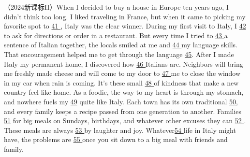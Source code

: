 \documentclass[a4paper]{ctexart}
\begin{document}
（2024新课标II）When I decided to buy a house in Europe ten years ago, I didn't think too long. I liked traveling in France, but when it came to picking my favorite spot to  \underline{\hspace{0.5cm}41 \hspace{0.5cm}}, Italy was the clear winner. During my first visit to Italy, I \underline{\hspace{0.5cm}42 \hspace{0.5cm}} to ask for directions or order in a restaurant. But every time I tried to \underline{\hspace{0.5cm}43 \hspace{0.5cm}} a sentence of Italian together, the locals smiled at me and \underline{\hspace{0.5cm}44 \hspace{0.5cm}} my language skills. That encouragement helped me to get through the language \underline{\hspace{0.5cm}45\hspace{0.5cm}}. After I made Italy my permanent home, I discovered how \underline{\hspace{0.5cm}46 \hspace{0.5cm}} Italians are. Neighbors will bring me freshly made cheese and will come to my door to \underline{\hspace{0.5cm}47 \hspace{0.5cm}} me to close the window in my car when rain is coming. It's these small \underline{\hspace{0.5cm}48 \hspace{0.5cm}} of kindness that make a new country feel like home. 
As a foodie, the way to my heart is through my stomach, and nowhere fuels my \underline{\hspace{0.5cm}49\hspace{0.5cm}} quite like Italy. Each town has its own traditional \underline{\hspace{0.5cm}50\hspace{0.5cm}}, and every family keeps a recipe passed from one generation to another. Families \underline{\hspace{0.5cm}51\hspace{0.5cm}} for big meals on Sundays, birthdays, and whatever other excuses they can \underline{\hspace{0.5cm}52 \hspace{0.5cm}}. These meals are always  \underline{\hspace{0.5cm}53 \hspace{0.5cm}}by laughter and joy. Whatever\underline{\hspace{0.5cm}54 \hspace{0.5cm}}life in Italy might have, the problems are \underline{\hspace{0.5cm}55 \hspace{0.5cm}} once you sit down to a big meal with friends and family. 
\end{document}

